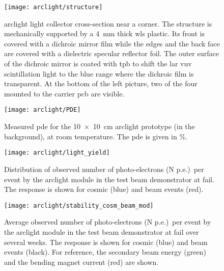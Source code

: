 \begin{figure}[htbp]
	\centering
	\texttt{[image: arclight/structure]}
	\caption[ light collector cross-section]{%
		\acrshort{arclight} light collector cross-section near a corner.
		The structure is mechanically supported by a \SI{4}{\milli\metre} thick \acrshort{wls} plastic.
		Its front is covered with a dichroic mirror film while the edges and the back face are covered with a dielectric specular reflector foil.
		The outer surface of the dichroic mirror is coated with \acrshort{tpb} to shift the \acrshort{lar} \acrshort{vuv} scintillation light to the blue range where the dichroic film is transparent.
		At the bottom of the left picture, two of the four  mounted to the carrier \acrshort{pcb} are visible.
	}
	\label{fig:arclight_structure}
\end{figure}

\begin{figure}[htbp]
	\centering
	\texttt{[image: arclight/PDE]}
	\caption[Measured  ]{%
		Measured \acrshort{pde} for the \SI{10 x 10}{\centi\metre} \acrshort{arclight} prototype (in the background), at room temperature.
		The \acrshort{pde} is given in \si{\percent}.
	}
	\label{fig:arclight_pde}
\end{figure}

\begin{figure}[htbp]
	\centering
	\texttt{[image: arclight/light\_yield]}
	\caption[\pixlar{}  response]{%
		Distribution of observed number of photo-electrons (N p.e.)\ per event by the \acrshort{arclight} module in the \pixlar{} test beam demonstrator at \acrshort{fail}.
		The response is shown for cosmic (blue) and beam events (red).
	}
	\label{fig:arclight_pixlar_response}
\end{figure}

\begin{figure}[htbp]
	\centering
	\texttt{[image: arclight/stability\_cosm\_beam\_mod]}
	\caption[\pixlar{}  response stability]{%
		Average observed number of photo-electrons (N p.e.)\ per event by the \acrshort{arclight} module in the \pixlar{} test beam demonstrator at \acrshort{fail} over several weeks.
		The response is shown for cosmic (blue) and beam events (black).
		For reference, the secondary beam energy (green) and the bending magnet current (red) are shown.
	}
	\label{fig:arclight_pixlar_stability}
\end{figure}

